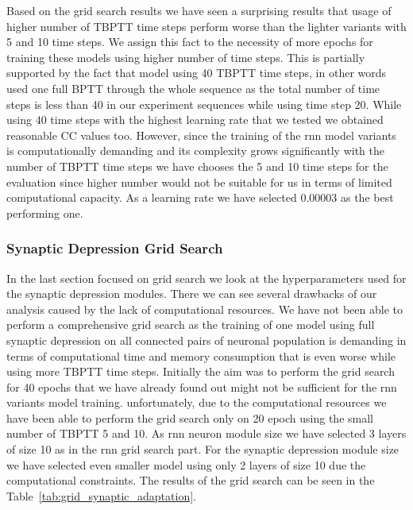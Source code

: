 Based on the grid search results we have seen a surprising results that usage of higher number of TBPTT time steps perform worse than the lighter variants with 5 and 10 time steps. We assign this fact to the necessity of more epochs for training these models using higher number of time steps. This is partially supported by the fact that model using 40 TBPTT time steps, in other words used one full BPTT through the whole sequence as the total number of time steps is less than 40 in our experiment sequences while using time step 20. While using 40 time steps with the highest learning rate that we tested we obtained reasonable CC values too. However, since the training of the rnn model variants is computationally demanding and its complexity grows significantly with the number of TBPTT time steps we have chooses the 5 and 10 time steps for the evaluation since higher number would not be suitable  for us in terms of limited computational capacity. As a learning rate we have selected $0.00003$ as the best performing one.

\subsubsection{Synaptic Depression Grid Search}
\label{subsubsec:synaptic_depression_grid_search}
In the last section focused on grid search we look at the hyperparameters used for the synaptic depression modules. There we can see several drawbacks of our analysis caused by the lack of computational resources. We have not been able to perform a comprehensive grid search as the training of one model using full synaptic depression on all connected pairs of neuronal population is demanding in terms of computational time and memory consumption that is even worse while using more TBPTT time steps. Initially the aim was to perform the grid search for 40 epochs that we have already found out might not be sufficient for the rnn variants model training. unfortunately, due to the computational resources we have been able to perform the grid search only on 20 epoch using the small number of TBPTT 5 and 10. As rnn neuron module size we have selected 3 layers of size 10 as in the rnn grid search part. For the synaptic depression module size we have selected even smaller model using only 2 layers of size 10 due the computational constraints. The results of the grid search can be seen in the Table~\ref{tab:grid_synaptic_adaptation}.

